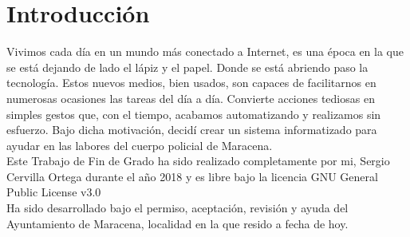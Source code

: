 \chapter{Introducción}

Vivimos cada día en un mundo más conectado a Internet, es una época en la que se está dejando de 
lado el lápiz y el papel. Donde se está abriendo paso la tecnología. Estos nuevos medios, bien
usados, son capaces de facilitarnos en numerosas ocasiones las tareas del día a día. Convierte acciones
tediosas en simples gestos que, con el tiempo, acabamos automatizando y realizamos sin esfuerzo. 
Bajo dicha motivación, decidí crear un sistema informatizado para ayudar en las labores del cuerpo policial de Maracena.\\

Este Trabajo de Fin de Grado ha sido realizado completamente por mi, Sergio 
Cervilla Ortega durante el año 2018 y es libre bajo la licencia GNU General Public License v3.0 \cite{gplv3}\\ 

Ha sido desarrollado bajo el permiso, aceptación, revisión y ayuda del Ayuntamiento de Maracena, localidad en
la que resido a fecha de hoy.\\

